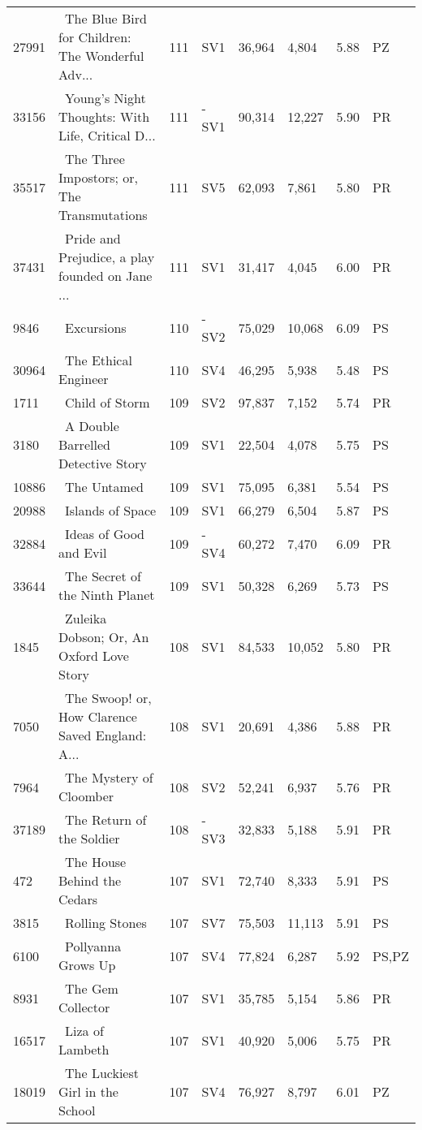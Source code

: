 \begin{longtable}{l | l | l | l | l | l | l | l}
27991 & ~The Blue Bird for Children: The Wonderful Adv... & 111 & SV1 & 36,964 & 4,804 & 5.88 & PZ\\
33156 & ~Young's Night Thoughts: With Life, Critical D... & 111 & -SV1 & 90,314 & 12,227 & 5.90 & PR\\
35517 & ~The Three Impostors; or, The Transmutations & 111 & SV5 & 62,093 & 7,861 & 5.80 & PR\\
37431 & ~Pride and Prejudice, a play founded on Jane ... & 111 & SV1 & 31,417 & 4,045 & 6.00 & PR\\
9846 & ~Excursions & 110 & -SV2 & 75,029 & 10,068 & 6.09 & PS\\
30964 & ~The Ethical Engineer & 110 & SV4 & 46,295 & 5,938 & 5.48 & PS\\
1711 & ~Child of Storm & 109 & SV2 & 97,837 & 7,152 & 5.74 & PR\\
3180 & ~A Double Barrelled Detective Story & 109 & SV1 & 22,504 & 4,078 & 5.75 & PS\\
10886 & ~The Untamed & 109 & SV1 & 75,095 & 6,381 & 5.54 & PS\\
20988 & ~Islands of Space & 109 & SV1 & 66,279 & 6,504 & 5.87 & PS\\
32884 & ~Ideas of Good and Evil & 109 & -SV4 & 60,272 & 7,470 & 6.09 & PR\\
33644 & ~The Secret of the Ninth Planet & 109 & SV1 & 50,328 & 6,269 & 5.73 & PS\\
1845 & ~Zuleika Dobson; Or, An Oxford Love Story & 108 & SV1 & 84,533 & 10,052 & 5.80 & PR\\
7050 & ~The Swoop! or, How Clarence Saved England: A... & 108 & SV1 & 20,691 & 4,386 & 5.88 & PR\\
7964 & ~The Mystery of Cloomber & 108 & SV2 & 52,241 & 6,937 & 5.76 & PR\\
37189 & ~The Return of the Soldier & 108 & -SV3 & 32,833 & 5,188 & 5.91 & PR\\
472 & ~The House Behind the Cedars & 107 & SV1 & 72,740 & 8,333 & 5.91 & PS\\
3815 & ~Rolling Stones & 107 & SV7 & 75,503 & 11,113 & 5.91 & PS\\
6100 & ~Pollyanna Grows Up & 107 & SV4 & 77,824 & 6,287 & 5.92 & PS,PZ\\
8931 & ~The Gem Collector & 107 & SV1 & 35,785 & 5,154 & 5.86 & PR\\
16517 & ~Liza of Lambeth & 107 & SV1 & 40,920 & 5,006 & 5.75 & PR\\
18019 & ~The Luckiest Girl in the School & 107 & SV4 & 76,927 & 8,797 & 6.01 & PZ\\

\end{longtable}

